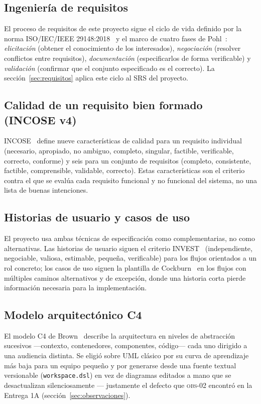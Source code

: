 \documentclass[11pt,a4paper]{article}
\begin{document}
\subsection{Ingeniería de requisitos}

El proceso de requisitos de este proyecto sigue el ciclo de vida definido
por la norma ISO/IEC/IEEE 29148:2018~\cite{iso29148} y el marco de cuatro
fases de Pohl~\cite{pohl2010}: \emph{elicitación} (obtener el conocimiento
de los interesados), \emph{negociación} (resolver conflictos entre
requisitos), \emph{documentación} (especificarlos de forma verificable) y
\emph{validación} (confirmar que el conjunto especificado es el correcto).
La sección~\ref{sec:requisitos} aplica este ciclo al SRS del proyecto.

\subsection{Calidad de un requisito bien formado (INCOSE v4)}

INCOSE~\cite{incose2023} define nueve características de calidad para un
requisito individual (necesario, apropiado, no ambiguo, completo, singular,
factible, verificable, correcto, conforme) y seis para un conjunto de
requisitos (completo, consistente, factible, comprensible, validable,
correcto). Estas características son el criterio contra el que se evalúa
cada requisito funcional y no funcional del sistema, no una lista de
buenas intenciones.

\subsection{Historias de usuario y casos de uso}

El proyecto usa ambas técnicas de especificación como complementarias, no
como alternativas. Las historias de usuario siguen el criterio
INVEST~\cite{cohn2004} (independiente, negociable, valiosa, estimable,
pequeña, verificable) para los flujos orientados a un rol concreto; los
casos de uso siguen la plantilla de Cockburn~\cite{cockburn2001} en los
flujos con múltiples caminos alternativos y de excepción, donde una
historia corta pierde información necesaria para la implementación.

\subsection{Modelo arquitectónico C4}

El modelo C4 de Brown~\cite{brown2018c4} describe la arquitectura en
niveles de abstracción sucesivos —contexto, contenedores, componentes,
código— cada uno dirigido a una audiencia distinta. Se eligió sobre UML
clásico por su curva de aprendizaje más baja para un equipo pequeño y por
generarse desde una fuente textual versionable (\texttt{workspace.dsl}) en
vez de diagramas editados a mano que se desactualizan silenciosamente —
justamente el defecto que \textsc{obs-02} encontró en la Entrega 1A
(sección~\ref{sec:observaciones}).
\end{document}
